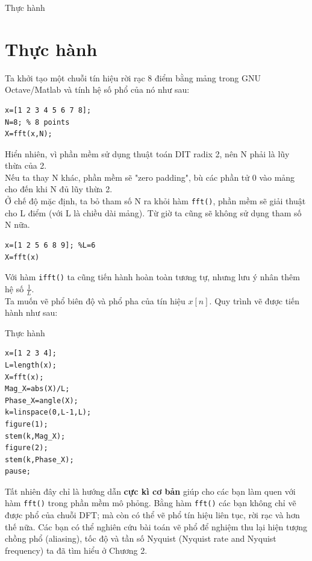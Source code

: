 \documentclass[8pt]{beamer}
\begin{document}
\begin{frame}[fragile]{Thực hành}
	\section{Thực hành}
Ta khởi tạo một chuỗi tín hiệu rời rạc 8 điểm bằng mảng trong GNU Octave/Matlab và tính hệ số phổ của nó như sau:
\begin{center}
\begin{verbatim}
x=[1 2 3 4 5 6 7 8];
N=8; % 8 points
X=fft(x,N);
\end{verbatim}
\end{center}
Hiển nhiên, vì phần mềm sử dụng thuật toán DIT radix 2, nên N phải là lũy thừa của 2. 
\\ Nếu ta thay N khác, phần mềm sẽ "zero padding", bù các phần tử 0 vào mảng cho đến khi N đủ lũy thừa 2. 
\\ Ở chế độ mặc định, ta bỏ tham số N ra khỏi hàm \verb|fft()|, phần mềm sẽ giải thuật cho L điểm (với L là chiều dài mảng). Từ giờ ta cũng sẽ không sử dụng tham số N nữa.
\begin{verbatim}
x=[1 2 5 6 8 9]; %L=6
X=fft(x)
\end{verbatim}
Với hàm \verb|ifft()| ta cũng tiến hành hoàn toàn tương tự, nhưng lưu ý \alert{nhân thêm hệ số $\frac{1}{L}$}.
\\Ta muốn vẽ phổ biên độ và phổ pha của tín hiệu $x[n]$. Quy trình vẽ được tiến hành như sau:
\end{frame}
\begin{frame}[fragile]{Thực hành}
\begin{verbatim}
x=[1 2 3 4];
L=length(x);
X=fft(x);
Mag_X=abs(X)/L;
Phase_X=angle(X);
k=linspace(0,L-1,L);
figure(1);
stem(k,Mag_X);
figure(2);
stem(k,Phase_X);
pause;
\end{verbatim}
Tất nhiên đây chỉ là hướng dẫn \textbf{cực kì cơ bản} giúp cho các bạn làm quen với hàm \verb|fft()| trong phần mềm mô phỏng. Bằng hàm \verb|fft()| các bạn không chỉ vẽ được phổ của chuỗi DFT; mà còn có thể vẽ phổ tín hiệu liên tục, rời rạc và hơn thế nữa. Các bạn có thể nghiên cứu bài toán vẽ phổ để nghiệm thu lại hiện tượng chồng phổ (aliasing), tốc độ và tần số Nyquist (Nyquist rate and Nyquist frequency) ta đã tìm hiểu ở \alert{Chương 2}.
\end{frame}
\end{document}
